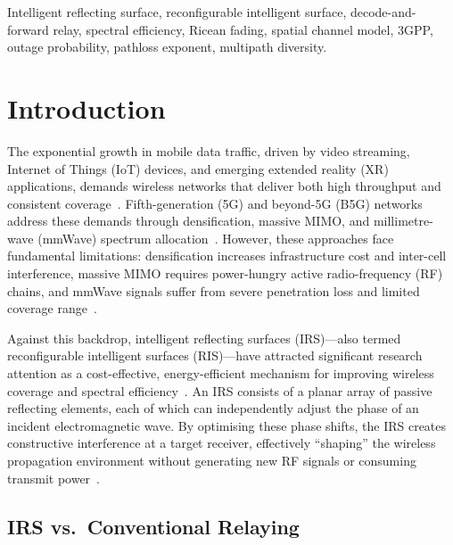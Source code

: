 \documentclass[journal]{IEEEtran} %
\begin{document}
\begin{IEEEkeywords}
Intelligent reflecting surface, reconfigurable intelligent surface, decode-and-forward relay, spectral efficiency, Ricean fading, spatial channel model, 3GPP, outage probability, pathloss exponent, multipath diversity.
\end{IEEEkeywords}

\section{Introduction}
\label{sec:introduction}

The exponential growth in mobile data traffic, driven by video streaming, Internet of Things (IoT) devices, and emerging extended reality (XR) applications, demands wireless networks that deliver both high throughput and consistent coverage~\cite{cisco2023forecast}. Fifth-generation (5G) and beyond-5G (B5G) networks address these demands through densification, massive MIMO, and millimetre-wave (mmWave) spectrum allocation~\cite{rappaport2015mmwave,andrews2014will}. However, these approaches face fundamental limitations: densification increases infrastructure cost and inter-cell interference, massive MIMO requires power-hungry active radio-frequency (RF) chains, and mmWave signals suffer from severe penetration loss and limited coverage range~\cite{bai2015coverage}.

Against this backdrop, intelligent reflecting surfaces (IRS)---also termed reconfigurable intelligent surfaces (RIS)---have attracted significant research attention as a cost-effective, energy-efficient mechanism for improving wireless coverage and spectral efficiency~\cite{wu2020irs_tutorial,basar2019wireless,direnzo2020smart}. An IRS consists of a planar array of passive reflecting elements, each of which can independently adjust the phase of an incident electromagnetic wave. By optimising these phase shifts, the IRS creates constructive interference at a target receiver, effectively ``shaping'' the wireless propagation environment without generating new RF signals or consuming transmit power~\cite{huang2019irs_ee}.

\subsection{IRS vs.\ Conventional Relaying}
\end{document}

